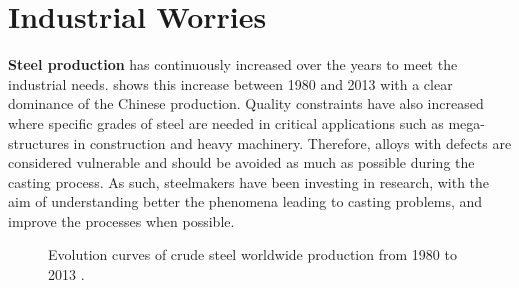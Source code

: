 \section{Industrial Worries}
\textbf{Steel production} has continuously increased over the years to meet the industrial needs.  shows this increase between 1980 and 2013 with a 
clear dominance of the Chinese production. Quality constraints have also increased where specific grades of steel are needed in critical applications such as mega-structures
in construction and  heavy machinery. Therefore, alloys with defects are considered vulnerable and should be avoided as much as possible during the casting process. As such, steelmakers have been investing
in research, with the aim of understanding better the phenomena leading to casting problems, and improve the processes when possible.
\begin{figure}[htbp]
\centering
{}
\caption{Evolution curves of crude steel worldwide production from 1980 to 2013 \citep{wsa_world_2014}.}
\label{fig:steel_production}
\end{figure}

